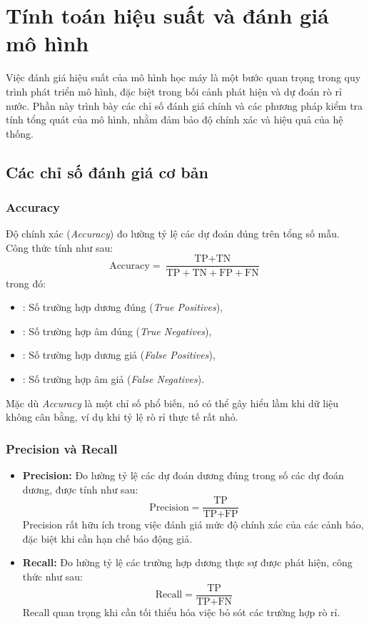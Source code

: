 \section{Tính toán hiệu suất và đánh giá mô hình}
\label{sec:model_evaluation}

Việc đánh giá hiệu suất của mô hình học máy là một bước quan trọng trong quy trình phát triển mô hình, đặc biệt trong bối cảnh phát hiện và dự đoán rò rỉ nước. Phần này trình bày các chỉ số đánh giá chính và các phương pháp kiểm tra tính tổng quát của mô hình, nhằm đảm bảo độ chính xác và hiệu quả của hệ thống.

\subsection{Các chỉ số đánh giá cơ bản}
\subsubsection{Accuracy}
Độ chính xác (\textit{Accuracy}) đo lường tỷ lệ các dự đoán đúng trên tổng số mẫu. Công thức tính như sau:
\[
\text{Accuracy} = \frac{\text{TP} + \text{TN}}{\text{TP} + \text{TN} + \text{FP} + \text{FN}}
\]
trong đó:
\begin{itemize}
    \item {}: Số trường hợp dương đúng (\textit{True Positives}),
    \item {}: Số trường hợp âm đúng (\textit{True Negatives}),
    \item {}: Số trường hợp dương giả (\textit{False Positives}),
    \item {}: Số trường hợp âm giả (\textit{False Negatives}).
\end{itemize}

Mặc dù \textit{Accuracy} là một chỉ số phổ biến, nó có thể gây hiểu lầm khi dữ liệu không cân bằng, ví dụ khi tỷ lệ rò rỉ thực tế rất nhỏ.

\subsubsection{Precision và Recall}
\begin{itemize}
    \item \textbf{Precision:} Đo lường tỷ lệ các dự đoán dương đúng trong số các dự đoán dương, được tính như sau:
    \[
    \text{Precision} = \frac{\text{TP}}{\text{TP} + \text{FP}}
    \]
    Precision rất hữu ích trong việc đánh giá mức độ chính xác của các cảnh báo, đặc biệt khi cần hạn chế báo động giả.

    \item \textbf{Recall:} Đo lường tỷ lệ các trường hợp dương thực sự được phát hiện, công thức như sau:
    \[
    \text{Recall} = \frac{\text{TP}}{\text{TP} + \text{FN}}
    \]
    Recall quan trọng khi cần tối thiểu hóa việc bỏ sót các trường hợp rò rỉ.
\end{itemize}

